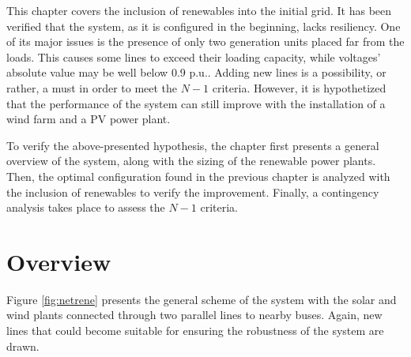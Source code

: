 This chapter covers the inclusion of renewables into the initial grid. It has been verified that the system, as it is configured in the beginning, lacks resiliency. One of its major issues is the presence of only two generation units placed far from the loads. This causes some lines to exceed their loading capacity, while voltages' absolute value may be well below 0.9 p.u.. Adding new lines is a possibility, or rather, a must in order to meet the $N-1$ criteria. However, it is hypothetized that the performance of the system can still improve with the installation of a wind farm and a PV power plant.

To verify the above-presented hypothesis, the chapter first presents a general overview of the system, along with the sizing of the renewable power plants. Then, the optimal configuration found in the previous chapter is analyzed with the inclusion of renewables to verify the improvement. Finally, a contingency analysis takes place to assess the $N-1$ criteria. 

\section{Overview}
Figure \ref{fig:netrene} presents the general scheme of the system with the solar and wind plants connected through two parallel lines to nearby buses. Again, new lines that could become suitable for ensuring the robustness of the system are drawn. 

